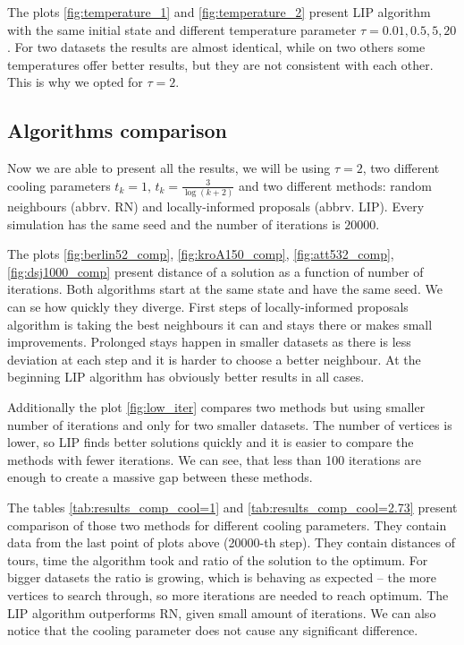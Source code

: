 	
	
	The plots \ref{fig:temperature_1} and \ref{fig:temperature_2} present LIP algorithm with the same initial state and different temperature parameter $\tau=0.01, 0.5, 5, 20$. For two datasets the results are almost identical, while on two others some temperatures offer better results, but they are not consistent with each other. This is why we opted for $\tau=2$.
	
\subsection{Algorithms comparison}
	Now we are able to present all the results, we will be using $\tau=2$, two different cooling parameters $t_k=1, \, t_k=\frac{3}{\log(k+2)}$ and two different methods: random neighbours (abbrv. RN) and locally-informed proposals (abbrv. LIP). Every simulation has the same seed and the number of iterations is $20000$.
	
	
	
	The plots \ref{fig:berlin52_comp}, \ref{fig:kroA150_comp}, \ref{fig:att532_comp}, \ref{fig:dsj1000_comp} present distance of a solution as a function of number of iterations. Both algorithms start at the same state and have the same seed. We can se how quickly they diverge. First steps of locally-informed proposals algorithm is taking the best neighbours it can and stays there or makes small improvements. Prolonged stays happen in smaller datasets as there is less deviation at each step and it is harder to choose a better neighbour. At the beginning LIP algorithm has obviously better results in all cases.
	
	Additionally the plot \ref{fig:low_iter} compares two methods but using smaller number of iterations and only for two smaller datasets. The number of vertices is lower, so LIP finds better solutions quickly and it is easier to compare the methods with fewer iterations. We can see, that less than 100 iterations are enough to create a massive gap between these methods.
	
	
	
	The tables \ref{tab:results_comp_cool=1} and \ref{tab:results_comp_cool=2.73} present comparison of those two methods for different cooling parameters. They contain data from the last point of plots above (20000-th step). They contain distances of tours, time the algorithm took and ratio of the solution to the optimum. For bigger datasets the ratio is growing, which is behaving as expected -- the more vertices to search through, so more iterations are needed to reach optimum. The LIP algorithm outperforms RN, given small amount of iterations. We can also notice that the cooling parameter does not cause any significant difference.
	

